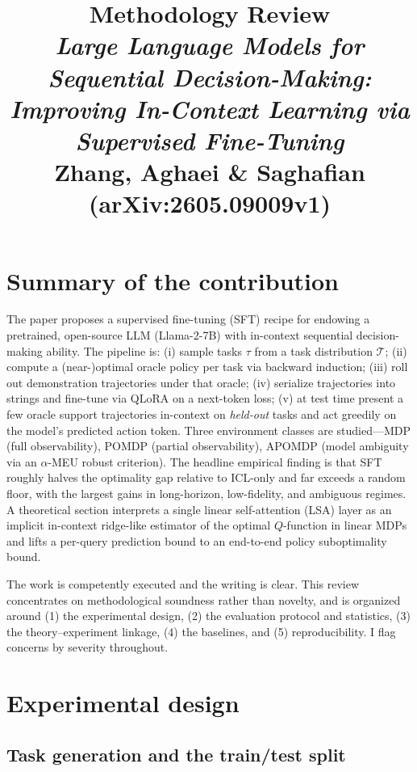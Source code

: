 \documentclass[11pt]{article}
\title{\bfseries Methodology Review\\[0.3em]
\large \emph{Large Language Models for Sequential Decision-Making:\\
Improving In-Context Learning via Supervised Fine-Tuning}\\[0.4em]
\normalsize Zhang, Aghaei \& Saghafian (arXiv:2605.09009v1)}
\author{}
\date{}
\begin{document}
\maketitle
\vspace{-2.5em}

\section{Summary of the contribution}

The paper proposes a supervised fine-tuning (SFT) recipe for endowing a pretrained,
open-source LLM (Llama-2-7B) with in-context sequential decision-making ability. The
pipeline is: (i) sample tasks $\tau$ from a task distribution $\mathcal{T}$; (ii) compute
a (near-)optimal oracle policy per task via backward induction; (iii) roll out
demonstration trajectories under that oracle; (iv) serialize trajectories into strings and
fine-tune via QLoRA on a next-token loss; (v) at test time present a few oracle support
trajectories in-context on \emph{held-out} tasks and act greedily on the model's predicted
action token. Three environment classes are studied---MDP (full observability), POMDP
(partial observability), APOMDP (model ambiguity via an $\alpha$-MEU robust criterion).
The headline empirical finding is that SFT roughly halves the optimality gap relative to
ICL-only and far exceeds a random floor, with the largest gains in long-horizon, low-fidelity,
and ambiguous regimes. A theoretical section interprets a single linear self-attention (LSA)
layer as an implicit in-context ridge-like estimator of the optimal $Q$-function in linear
MDPs and lifts a per-query prediction bound to an end-to-end policy suboptimality bound.

The work is competently executed and the writing is clear. This review concentrates on
methodological soundness rather than novelty, and is organized around (1) the
experimental design, (2) the evaluation protocol and statistics, (3) the theory--experiment
linkage, (4) the baselines, and (5) reproducibility. I flag concerns by severity throughout.

\section{Experimental design}

\subsection{Task generation and the train/test split}
\end{document}
